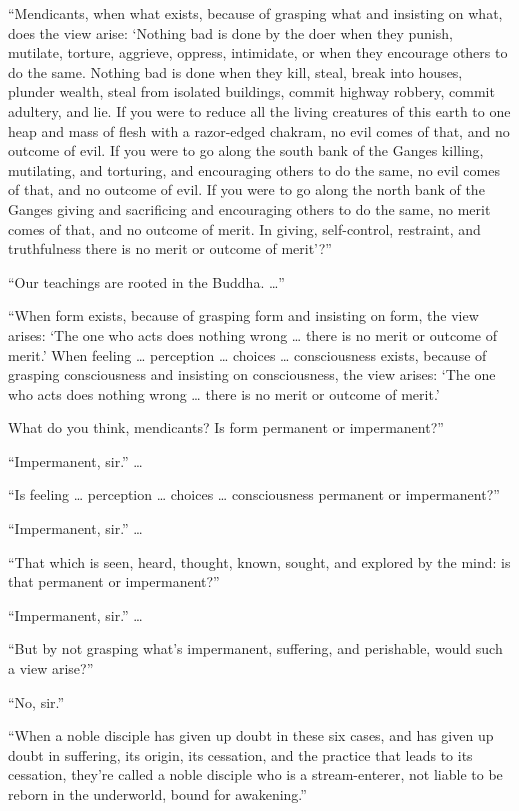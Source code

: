 \documentclass[12pt,openany]{book}%
\begin{document}
“Mendicants, when what exists, because of grasping what and insisting on what, does the view arise: ‘Nothing bad is done by the doer when they punish, mutilate, torture, aggrieve, oppress, intimidate, or when they encourage others to do the same. Nothing bad is done when they kill, steal, break into houses, plunder wealth, steal from isolated buildings, commit highway robbery, commit adultery, and lie. If you were to reduce all the living creatures of this earth to one heap and mass of flesh with a razor-edged chakram, no evil comes of that, and no outcome of evil. If you were to go along the south bank of the Ganges killing, mutilating, and torturing, and encouraging others to do the same, no evil comes of that, and no outcome of evil. If you were to go along the north bank of the Ganges giving and sacrificing and encouraging others to do the same, no merit comes of that, and no outcome of merit. In giving, self-control, restraint, and truthfulness there is no merit or outcome of merit’?” 

“Our teachings are rooted in the Buddha. …” 

“When form exists, because of grasping form and insisting on form, the view arises: ‘The one who acts does nothing wrong … there is no merit or outcome of merit.’ When feeling … perception … choices … consciousness exists, because of grasping consciousness and insisting on consciousness, the view arises: ‘The one who acts does nothing wrong … there is no merit or outcome of merit.’ 

What do you think, mendicants? Is form permanent or impermanent?” 

“Impermanent, sir.” … 

“Is feeling … perception … choices … consciousness permanent or impermanent?” 

“Impermanent, sir.” … 

“That which is seen, heard, thought, known, sought, and explored by the mind: is that permanent or impermanent?” 

“Impermanent, sir.” … 

“But by not grasping what’s impermanent, suffering, and perishable, would such a view arise?” 

“No, sir.” 

“When a noble disciple has given up doubt in these six cases, and has given up doubt in suffering, its origin, its cessation, and the practice that leads to its cessation, they’re called a noble disciple who is a stream-enterer, not liable to be reborn in the underworld, bound for awakening.” 
\end{document}

